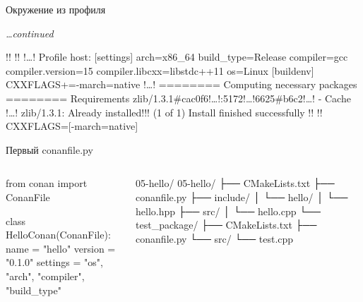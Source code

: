 \documentclass[compress, 8pt, aspectratio=169]{beamer}
\newcommand{\excl}{!}
\begin{document}
\begin{frame}[fragile]{Окружение из профиля}

  \textit{\dots continued}\bigbreak

  {\small
  \begin{terminalwindow}[!!][minted options={escapeinside=!!, firstline=16}]
!!
!!
!\dots!
Profile host:
[settings]
arch=x86_64
build_type=Release
compiler=gcc
compiler.version=15
compiler.libcxx=libstdc++11
os=Linux
[buildenv]
CXXFLAGS+=-march=native
!\dots!
======== Computing necessary packages ========
Requirements
    zlib/1.3.1#cac0f6!\dots!:5172!\dots!6625#b6c2!\dots! - Cache
!\dots!
zlib/1.3.1: Already installed!\excl! (1 of 1)
Install finished successfully
!!
!!
CXXFLAGS=[-march=native]
  \end{terminalwindow}
  }

\end{frame}

\begin{frame}[fragile]{Первый conanfile.py}

  \begin{columns}[T]


    \begin{myinplacelisting}[minted language=python]
from conan import ConanFile


class HelloConan(ConanFile):
    name = "hello"
    version = "0.1.0"
    settings = "os", "arch", "compiler",
      "build_type"
    \end{myinplacelisting}


    \begin{mytitledinplacelisting}[minted language=text]{05-hello/}
05-hello/
├── CMakeLists.txt
├── conanfile.py
├── include/
│   └── hello/
│       └── hello.hpp
├── src/
│   └── hello.cpp
└── test_package/
    ├── CMakeLists.txt
    ├── conanfile.py
    └── src/
        └── test.cpp
    \end{mytitledinplacelisting}

  \end{columns}

\end{frame}
\end{document}
